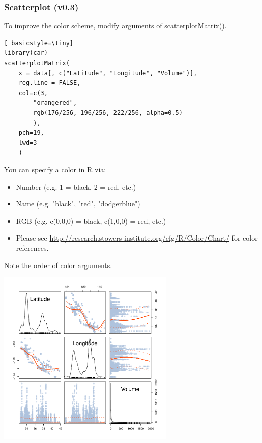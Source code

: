 \begin{frame}
\frametitle{Scatterplot (v0.3)}

To improve the color scheme, modify arguments of \ttfamily scatterplotMatrix().  
  		\begin{lstlisting}[ basicstyle=\tiny]
library(car)		
scatterplotMatrix(
	x = data[, c("Latitude", "Longitude", "Volume")], 
	reg.line = FALSE,
	col=c(3,
		"orangered",
		rgb(176/256, 196/256, 222/256, alpha=0.5)
		), 
	pch=19,
	lwd=3
	)
		\end{lstlisting}
\normalfont
\framebreak
You can specify a color in R via: 
\begin{itemize}
	\item Number (e.g. 1 = black, 2 = red, etc.)
	\item Name (e.g. "black", "red", "dodgerblue")
	\item RGB (e.g. c(0,0,0) = black, c(1,0,0) = red, etc.)
	\item Please see \url{http://research.stowers-institute.org/efg/R/Color/Chart/} for color references. 
\end{itemize}

\noindent Note the order of color arguments. \normalfont
        \begin{center}
         \includegraphics[width=0.63\textwidth]{images/scatterPlot_v3.pdf}
        \end{center}
\end{frame}


